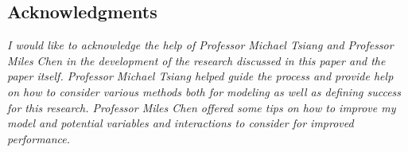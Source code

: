\documentclass[
]{article}
\begin{document}
\hypertarget{acknowledgments}{%
\subsection{Acknowledgments}\label{acknowledgments}}

\emph{I would like to acknowledge the help of Professor Michael Tsiang
and Professor Miles Chen in the development of the research discussed in
this paper and the paper itself. Professor Michael Tsiang helped guide
the process and provide help on how to consider various methods both for
modeling as well as defining success for this research. Professor Miles
Chen offered some tips on how to improve my model and potential
variables and interactions to consider for improved performance.}
\end{document}

